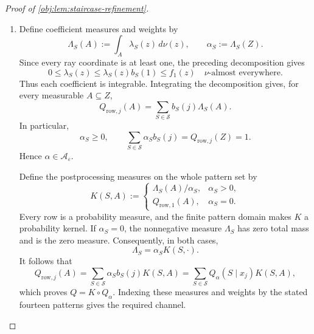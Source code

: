 \begin{proof}[Proof of \cref{obj:lem:staircase-refinement}]
\begin{enumerate}
For every subset \(T\subseteq\mathcal X\), including the empty and full subsets, define
\[
\omega_T(z):=
\prod_{j:\,x_j\in T}y_j(z)
\prod_{j:\,x_j\notin T}(1-y_j(z)).
\]
Expanding the products yields
\[
\sum_{T\subseteq\mathcal X}\omega_T(z)=1,
\qquad
\sum_{\substack{T\subseteq\mathcal X\\x_j\in T}}\omega_T(z)=y_j(z),
\]
and consequently
\[
\sum_{T\subseteq\mathcal X}\omega_T(z)b_T(j)
=1+(r-1)y_j(z).
\]
To express this sum using proper nonempty subsets, put
\[
S_\dagger:=\{x_1\},
\qquad
k_{\mathrm{cube}}(z):=
\frac{\omega_\varnothing(z)+r\omega_{\mathcal X}(z)}{r+1},
\]
and, for \(S\in\mathcal S\), define
\[
\lambda_S(z):=
\max\left\{
0,\,
m_{\mathrm{base}}(z)
\left[
\omega_S(z)+k_{\mathrm{cube}}(z)
\bigl(\mathbf1_{\{S=S_\dagger\}}
+\mathbf1_{\{S=\mathcal X\setminus S_\dagger\}}\bigr)
\right]
\right\}.
\]
These functions are measurable and nonnegative on all of \(Z\). On the common set where the privacy inequalities hold, their expressions inside the maximum are nonnegative. Moreover,
\[
b_{S_\dagger}(j)+b_{\mathcal X\setminus S_\dagger}(j)=r+1,
\]
so the added complementary-pair contribution is precisely
\(\omega_\varnothing+r\omega_{\mathcal X}\), the contribution of the empty and full subsets. Therefore
\[
f_j(z)=\sum_{S\in\mathcal S}\lambda_S(z)b_S(j)
\quad\text{for \(\nu\)-almost every \(z\), for every \(j\)}.
\]
The case \(m_{\mathrm{base}}=0\) gives zero on both sides.

\item
Define coefficient measures and weights by
\[
\Lambda_S(A):=\int_A\lambda_S(z)\,d\nu(z),
\qquad
\alpha_S:=\Lambda_S(Z).
\]
Since every ray coordinate is at least one, the preceding decomposition gives
\[
0\le\lambda_S(z)
\le\lambda_S(z)b_S(1)
\le f_1(z)
\quad\text{\(\nu\)-almost everywhere}.
\]
Thus each coefficient is integrable. Integrating the decomposition gives, for every measurable \(A\subseteq Z\),
\[
Q_{\mathrm{row},j}(A)=\sum_{S\in\mathcal S}b_S(j)\Lambda_S(A).
\]
In particular,
\[
\alpha_S\ge0,
\qquad
\sum_{S\in\mathcal S}\alpha_S b_S(j)=Q_{\mathrm{row},j}(Z)=1.
\]
Hence \(\alpha\in\mathcal A_\varepsilon\).

Define the postprocessing measures on the whole pattern set by
\[
K(S,A):=
\begin{cases}
\Lambda_S(A)/\alpha_S,&\alpha_S>0,\\
Q_{\mathrm{row},1}(A),&\alpha_S=0.
\end{cases}
\]
Every row is a probability measure, and the finite pattern domain makes \(K\) a probability kernel. If \(\alpha_S=0\), the nonnegative measure \(\Lambda_S\) has zero total mass and is the zero measure. Consequently, in both cases,
\[
\Lambda_S=\alpha_S K(S,\cdot).
\]
It follows that
\[
Q_{\mathrm{row},j}(A)
=\sum_{S\in\mathcal S}\alpha_S b_S(j)K(S,A)
=\sum_{S\in\mathcal S}Q_\alpha(S\mid x_j)K(S,A),
\]
which proves \(Q=K\circ Q_\alpha\). Indexing these measures and weights by the stated fourteen patterns gives the required channel.


\end{enumerate}
\end{proof}
